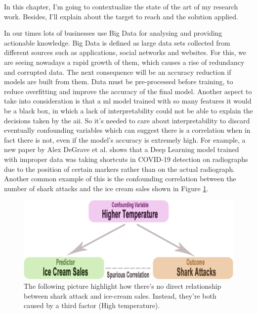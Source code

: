In this chapter, I'm going to contextualize the state of the art of my research work. 
Besides, I'll explain about the target to reach and the solution applied.\par
In our times lots of businesses use Big Data for analysing and providing actionable knowledge.
Big Data is defined as large data sets collected from different sources such as applications, social networks and websites.
For this, we are seeing nowadays a rapid growth of them, which causes a rise of redundancy and corrupted data.
The next consequence will be an accuracy reduction if models are built from them.
Data must be pre-processed before training, to reduce overfitting and improve the accuracy of the final model.\newline
Another aspect to take into consideration is that a \acrshort{ml} model trained with so many features it would be a black box, in which a lack of interpretability could not be able to explain the decisions taken by the \gls{aii}.
So it's needed to care about interpretability to discard eventually confounding variables which can suggest there is a correlation when in fact there is not, even if the model's accuracy is extremely high.
For example, a new paper by Alex DeGrave et al.\cite{degrave2021ai} shows that a Deep Learning model trained with improper data was taking shortcuts in COVID-19 detection on radiographs due to the position of certain markers rather than on the actual radiograph.
Another common example of this is the confounding correlation between the number of shark attacks and the ice cream sales shown in Figure \ref{fig:shark}.\newline
\begin{figure}[H]
    \centering
    \includegraphics[scale=0.25]{images/confounding.png}
    \caption{The following picture\cite{shark-icecream} highlight how there's no direct relationship between shark attack and ice-cream sales. Instead, they're both caused by a third factor (High temperature)\cite{siegel2019ice}.}
    \label{fig:shark}
\end{figure}
